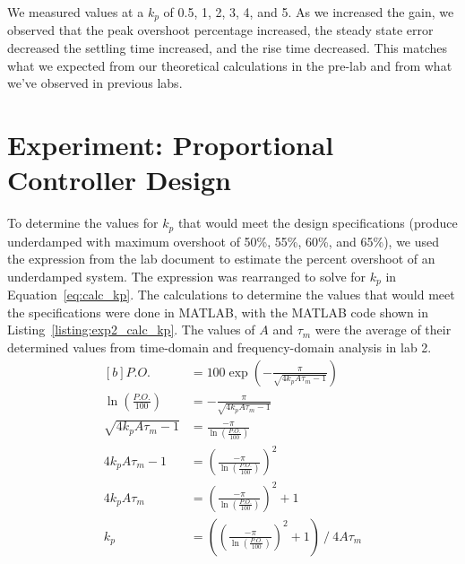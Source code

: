 \documentclass[12pt]{article}
\begin{document}
We measured values at a $k_p$ of 0.5, 1, 2, 3, 4, and 5. As we increased the gain, we observed that the peak overshoot percentage increased, the steady state error decreased the settling time increased, and the rise time decreased. This matches what we expected from our theoretical calculations in the pre-lab and from what we've observed in previous labs. %

\section{Experiment: Proportional Controller Design}
To determine the values for $k_p$ that would meet the design specifications (produce underdamped with maximum overshoot of 50\%, 55\%, 60\%, and 65\%), we used the expression from the lab document to estimate the percent overshoot of an underdamped system. The expression was rearranged to solve for $k_p$ in Equation~\ref{eq:calc_kp}. The calculations to determine the values that would meet the specifications were done in MATLAB, with the MATLAB code shown in Listing~\ref{listing:exp2_calc_kp}. The values of $A$ and $\tau_m$ were the average of their determined values from time-domain and frequency-domain analysis in lab 2.
\begin{equation} \label{eq:calc_kp}
\begin{aligned}[b]
    P.O. &= 100\exp\left( -\frac{\pi}{\sqrt{4k_pA\tau_m-1}} \right) \\
    \ln\left(\frac{P.O.}{100}\right) &= -\frac{\pi}{\sqrt{4k_pA\tau_m-1}} \\
    \sqrt{4k_pA\tau_m-1} &= \frac{-\pi}{\ln\left(\frac{P.O.}{100}\right)} \\
    4k_pA\tau_m - 1 &= \left(\frac{-\pi}{\ln\left(\frac{P.O.}{100}\right)}\right)^2 \\
    4k_pA\tau_m &= \left(\frac{-\pi}{\ln\left(\frac{P.O.}{100}\right)}\right)^2 + 1 \\
    k_p &= \left( \left(\frac{-\pi}{\ln\left(\frac{P.O.}{100}\right)}\right)^2 + 1 \right) \ / \ 4A\tau_m
\end{aligned}
\end{equation}

\end{document}
